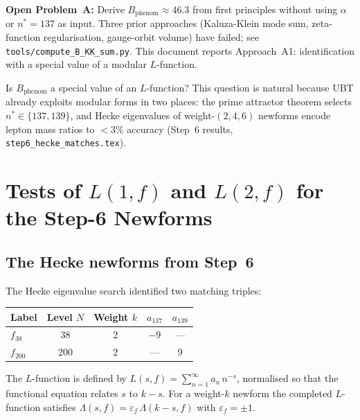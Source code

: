 \documentclass[12pt,a4paper]{article}
\theoremstyle{definition}
\theoremstyle{remark}
\begin{document}
\begin{gapbox}
\textbf{Open Problem~A:} Derive $B_{\mathrm{phenom}} \approx 46.3$ from first
principles without using $\alpha$ or $n^* = 137$ as input.  Three prior
approaches (Kaluza-Klein mode sum, zeta-function regularisation, gauge-orbit
volume) have failed; see \texttt{tools/compute\_B\_KK\_sum.py}.  This document
reports Approach~A1: identification with a special value of a modular
$L$-function.
\end{gapbox}

Is $B_{\mathrm{phenom}}$ a special value of an $L$-function?  This question
is natural because UBT already exploits modular forms in two places: the prime
attractor theorem selects $n^* \in \{137, 139\}$, and Hecke eigenvalues of
weight-$(2,4,6)$ newforms encode lepton mass ratios to $<3\%$ accuracy
(Step~6 results, \texttt{step6\_hecke\_matches.tex}).

\section{Tests of $L(1,f)$ and $L(2,f)$ for the Step-6 Newforms}
\label{sec:Lvalue_tests}

\subsection{The Hecke newforms from Step~6}

The Hecke eigenvalue search identified two matching triples:

\begin{center}
\begin{tabular}{lcccc}
  \toprule
  Label & Level $N$ & Weight $k$ & $a_{137}$ & $a_{139}$ \\
  \midrule
  $f_{38}$ & 38 & 2 & $-9$ & --- \\
  $f_{200}$ & 200 & 2 & --- & $9$ \\
  \bottomrule
\end{tabular}
\end{center}

The $L$-function is defined by $L(s,f) = \sum_{n=1}^\infty a_n\,n^{-s}$,
normalised so that the functional equation relates $s$ to $k - s$.  For a
weight-$k$ newform the completed $L$-function satisfies
$\Lambda(s,f) = \varepsilon_f\,\Lambda(k-s,f)$ with $\varepsilon_f = \pm 1$.
\end{document}
